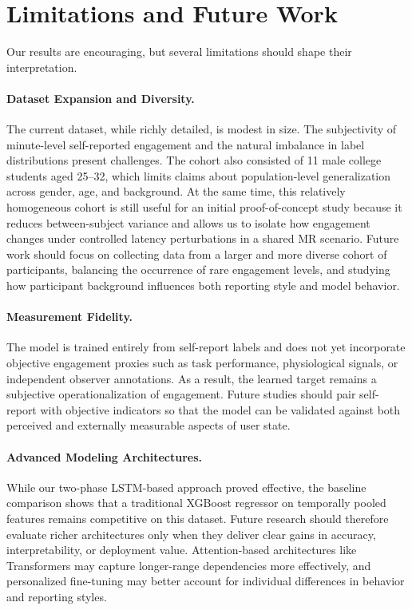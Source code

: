 \documentclass[review]{vgtc}                 %
\newif\ifprintcomments
\newcommand{\peng}[1]{
    \ifprintcomments
        \textcolor{red}{[\textbf{Peng:} #1]}
    \fi}
\begin{document}
\section{Limitations and Future Work}

Our results are encouraging, but several limitations should shape their interpretation.

\paragraph{Dataset Expansion and Diversity.} The current dataset, while richly detailed, is modest in size. The subjectivity of minute-level self-reported engagement and the natural imbalance in label distributions present challenges. The cohort also consisted of 11 male college students aged 25--32, which limits claims about population-level generalization across gender, age, and background. At the same time, this relatively homogeneous cohort is still useful for an initial proof-of-concept study because it reduces between-subject variance and allows us to isolate how engagement changes under controlled latency perturbations in a shared MR scenario. Future work should focus on collecting data from a larger and more diverse cohort of participants, balancing the occurrence of rare engagement levels, and studying how participant background influences both reporting style and model behavior.

\paragraph{Measurement Fidelity.} The model is trained entirely from self-report labels and does not yet incorporate objective engagement proxies such as task performance, physiological signals, or independent observer annotations. As a result, the learned target remains a subjective operationalization of engagement. Future studies should pair self-report with objective indicators so that the model can be validated against both perceived and externally measurable aspects of user state.

\paragraph{Advanced Modeling Architectures.} While our two-phase LSTM-based approach proved effective, the baseline comparison shows that a traditional XGBoost regressor on temporally pooled features remains competitive on this dataset. Future research should therefore evaluate richer architectures only when they deliver clear gains in accuracy, interpretability, or deployment value. Attention-based architectures like Transformers may capture longer-range dependencies more effectively, and personalized fine-tuning may better account for individual differences in behavior and reporting styles.
\end{document}
